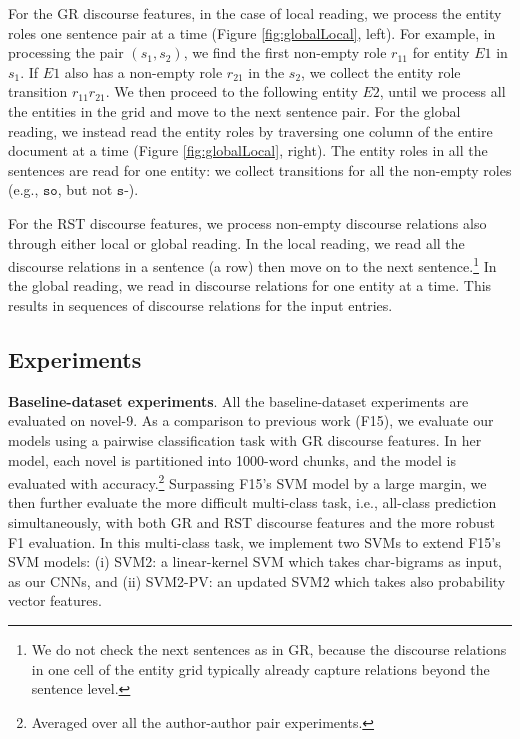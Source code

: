For the GR discourse features, in the case of local reading, we process the entity roles one sentence pair at a time (Figure \ref{fig:globalLocal}, left).
For example, in processing the pair $(s_1,s_2)$, 
we find the first non-empty role $r_{11}$ for entity $E1$ in $s_1$. If $E1$ also has a non-empty role $r_{21}$ in the $s_2$, we collect the entity role transition $r_{11}r_{21}$. We then proceed to the following entity $E2$, until we process all the entities in the grid and move to the next sentence pair. 
For the global reading, we instead read the entity roles by traversing one column of the entire document at a time (Figure \ref{fig:globalLocal}, right). The entity roles in all the sentences are read for one entity: 
we collect transitions for all the non-empty roles (e.g., $\texttt{so}$, but not $\texttt{s-}$).

For the RST discourse features, we process non-empty discourse relations also through either local or global reading.
In the local reading, we read all the discourse relations in a sentence (a row) then move on to the next sentence.\footnote{We do not check the next sentences as in GR, because the discourse relations in one cell of the entity grid typically already capture relations beyond the sentence level.}
In the global reading, we read in discourse relations for one entity at a time. 
This results in sequences of discourse relations for the input entries. 

\subsection{Experiments}
\label{subsec:experiments}

\textbf{Baseline-dataset experiments}.
All the baseline-dataset experiments are evaluated on novel-9. As a comparison to previous work (F15), we evaluate our models using a pairwise classification task with GR discourse features. In her model, each novel is partitioned into 1000-word chunks, and the model is evaluated with accuracy.\footnote{Averaged over all the author-author pair experiments.}
Surpassing F15's SVM model by a large margin, we then further evaluate the more difficult multi-class task, i.e., all-class prediction simultaneously, with both GR and RST discourse features and the more robust F1 evaluation.
In this multi-class task, we implement two SVMs to extend F15's SVM models:
(i) SVM2: a linear-kernel SVM which takes char-bigrams as input, as our CNNs, and (ii) SVM2-PV: an updated SVM2 which takes also probability vector features.

